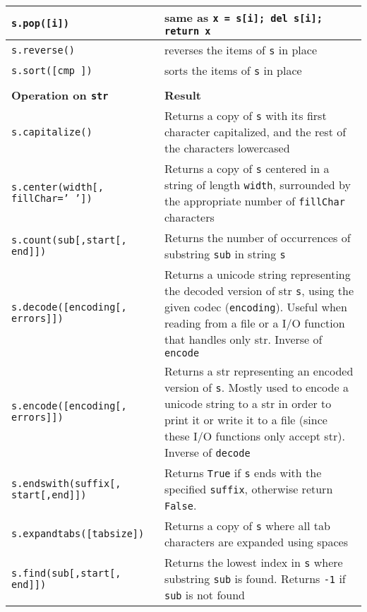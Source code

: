 \begin{longtable}{|p{5cm}|p{10cm}|}
\tt s.pop([i]) 			& same as {\tt x = s[i]; del s[i]; return x} 	\\
\hline
\tt s.reverse() 		& reverses the items of {\tt s} in place \\	
\tt s.sort([cmp ]) 		& sorts the items of {\tt s} in place \\   
\hline
\multicolumn{2}{l}{}\\
\hline
\bf Operation on {\tt str}	\label{tab:chaines} &	\bf Result \\
\hline
\hline
\tt s.capitalize() 			& Returns a copy of {\tt s} with its first character capitalized, and the rest of the characters lowercased\\ 	 
\tt s.center(width[,\newline
\mbox{}\hfill fillChar=' ']) 		& Returns a copy of {\tt s} centered in a string of length {\tt width}, surrounded by the appropriate 
					  number of {\tt fillChar} characters\\ 	
\tt s.count(sub[,start[,\newline
\mbox{}\hfill end]]) 			& Returns the number of occurrences of substring {\tt sub} in string {\tt s}\\ 	
\tt s.decode([encoding[,\newline
\mbox{}\hfill errors]]) 		& Returns a unicode string representing the decoded version of str {\tt s}, 
					  using the given codec ({\tt encoding}). Useful when reading from a file 
					  or a I/O function that handles only str. Inverse of {\tt encode}\\	
\tt s.encode([encoding[,\newline
\mbox{}\hfill errors]]) 		& Returns a str representing an encoded version of {\tt s}. 
					  Mostly used to encode a unicode string to a str in order 
					  to print it or write it to a file (since these I/O functions
					  only accept str). Inverse of {\tt decode} \\	
\tt s.endswith(suffix[,\newline
\mbox{}\hfill start[,end]]) 		& Returns {\tt True} if {\tt s} ends with the specified {\tt suffix}, 
					  otherwise return {\tt False}.\\	
\tt s.expandtabs([tabsize]) 		& Returns a copy of {\tt s} where all tab characters are expanded using spaces\\ 	
\tt s.find(sub[,start[,\newline
\mbox{}\hfill end]]) 			& Returns the lowest index in {\tt s} where substring {\tt sub} is found. Returns {\tt -1} if {\tt sub} is not found\\ 	

\end{longtable}
